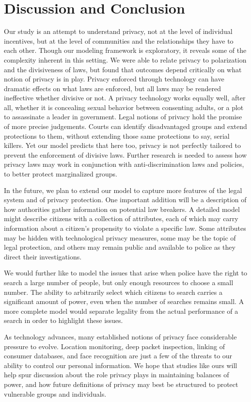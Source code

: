 
\section{Discussion and Conclusion}
\label{sec:concl}

Our study is an attempt to understand privacy, not at the level of individual incentives, but at the level of communities and the relationships they have to each other.  Though our modeling framework is exploratory, it reveals some of the complexity inherent in this setting.  We were able to relate privacy to polarization and the divisiveness of laws, but found that outcomes depend critically on what notion of privacy is in play.  Privacy enforced through technology can have dramatic effects on what laws are enforced, but all laws may be rendered ineffective whether divisive or not.  A privacy technology works equally well, after all, whether it is concealing sexual behavior between consenting adults, or a plot to assassinate a leader in government.  Legal notions of privacy hold the promise of more precise judgements.  Courts can identify disadvantaged groups and extend protections to them, without extending those same protections to say, serial killers.  Yet our model predicts that here too, privacy is not perfectly tailored to prevent the enforcement of divisive laws.  Further research is needed to assess how privacy laws may work in conjunction with anti-discrimination laws and policies, to better protect marginalized groups. 

In the future, we plan to extend our model to capture more features of the legal system and of privacy protection.  One important addition will be a description of how authorities gather information on potential law breakers.  A detailed model might describe citizens with a collection of attributes, each of which may carry information about a citizen's propensity to violate a specific law.  Some attributes may be hidden with technological privacy measures, some may be the topic of legal protection, and others may remain public and available to police as they direct their investigations.  

We would further like to model the issues that arise when police have the right to search a large number of people, but only enough resources to choose a small number.  The ability to arbitrarily select which citizens to search carries a significant amount of power, even when the number of searches remains small.  A more complete model would separate legality from the actual performance of a search in order to highlight these issues.

As technology advances, many established notions of privacy face considerable pressure to evolve.  Location monitoring, deep packet inspection, linking of consumer databases, and face recognition are just a few of the threats to our ability to control our personal information.  We hope that studies like ours will help spur discussion about the role privacy plays in maintaining balances of power, and how future definitions of privacy may best be structured to protect vulnerable groups and individuals.


